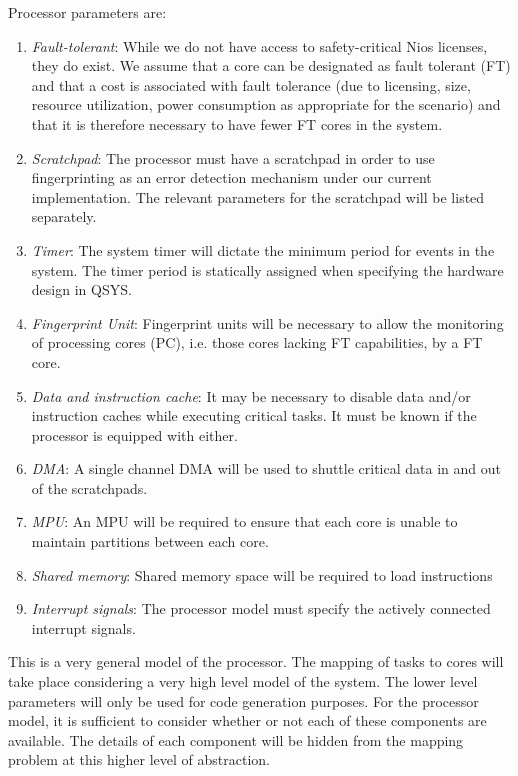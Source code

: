 \documentclass[table,11pt]{article}
\begin{document}
Processor parameters are:
\begin{enumerate}
\item \emph{Fault-tolerant}: While we do not have access to safety-critical Nios licenses, they do exist. We assume that a core can be designated as fault tolerant (FT) and that a cost is associated with fault tolerance (due to licensing, size, resource utilization, power consumption as appropriate for the scenario) and that it is therefore necessary to have fewer FT cores in the system.

\item \emph{Scratchpad}: 
The processor must have a scratchpad in order to use fingerprinting as an error detection mechanism under our current implementation. The relevant parameters for the scratchpad will be listed separately.

\item \emph{Timer}: 
The system timer will dictate the minimum period for events in the system. The timer period is statically assigned when specifying the hardware design in QSYS.

\item \emph{Fingerprint Unit}: 
Fingerprint units will be necessary to allow the monitoring of processing cores (PC), i.e. those cores lacking FT capabilities, by a FT core.
 
\item \emph{Data and instruction cache}: 
It may be necessary to disable data and/or instruction caches while executing critical tasks. It must be known if the processor is equipped with either.

\item \emph{DMA}:
A single channel DMA will be used to shuttle critical data in and out of the scratchpads.

\item \emph{MPU}:
An MPU will be required to ensure that each core is unable to maintain partitions between each core.

\item \emph{Shared memory}:
Shared memory space will be required to load instructions

\item \emph{Interrupt signals}:
The processor model must specify the actively connected interrupt signals.

\end{enumerate}

This is a very general model of the processor. The mapping of tasks to cores will take place considering a very high level model of the system. The lower level parameters will only be used for code generation purposes. For the processor model, it is sufficient to consider whether or not each of these components are available. The details of each component will be hidden from the mapping problem at this higher level of abstraction.
\end{document}
